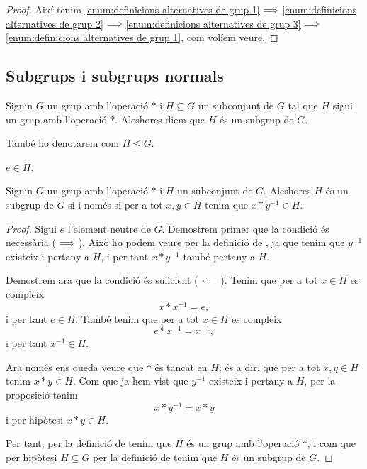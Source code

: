 \documentclass[../Apunts.tex]{subfiles}
\begin{document}
\begin{theorem}
\begin{proof}
			Així tenim \eqref{enum:definicions alternatives de grup 1}\(\implies\)\eqref{enum:definicions alternatives de grup 2}\(\implies\)\eqref{enum:definicions alternatives de grup 3}\(\implies\)\eqref{enum:definicions alternatives de grup 1}, com volíem veure.
		\end{proof}
	\end{theorem}
	\subsection{Subgrups i subgrups normals}
	\begin{definition}[Subgrup]
		\label{def:subgrup}
		Siguin \(G\) un grup amb l'operació \(\ast\) i \(H\subseteq G\) un subconjunt de \(G\) tal que \(H\) sigui un grup amb l'operació \(\ast\). Aleshores diem que \(H\) és un subgrup de \(G\).
		
		També ho denotarem com \(H\leq G\).
	\end{definition}
	\begin{observation}
		\label{obs:l'element neutre d'un grup pertany als subgrups}
		\(e\in H\).
	\end{observation}
	\begin{proposition}
		\label{prop:condició equivalent a subgrup}
		Siguin \(G\) un grup amb l'operació \(\ast\) i \(H\) un subconjunt de \(G\). Aleshores \(H\) és un subgrup de \(G\) si i només si per a tot \(x,y\in H\) tenim que \(x\ast y^{-1}\in H\).
		\begin{proof}
			Sigui \(e\) l'element neutre de \(G\). Demostrem primer que la condició és necessària (\(\implies\)). Això ho podem veure per la definició de , ja que tenim que \(y^{-1}\) existeix i pertany a \(H\), i per tant \(x\ast y^{-1}\) també pertany a \(H\).
			
			Demostrem ara que la condició és suficient (\(\impliedby\)). Tenim que per a tot \(x\in H\) es compleix
			\[x\ast x^{-1}=e,\]
			i per tant \(e\in H\). També tenim que per a tot \(x\in H\) es compleix
			\[e\ast x^{-1}=x^{-1},\]
			i per tant \(x^{-1}\in H\).
			
			Ara només ens queda veure que \(\ast\) és tancat en \(H\); és a dir, que per a tot \(x,y\in H\) tenim \(x\ast y\in H\). Com que ja hem vist que \(y^{-1}\) existeix i pertany a \(H\), per la proposició  tenim
			\[x\ast y^{-1}=x\ast y\]
			i per hipòtesi \(x\ast y\in H\).
			
			Per tant, per la definició de  tenim que \(H\) és un grup amb l'operació \(\ast\), i com que per hipòtesi \(H\subseteq G\) per la definició de  tenim que \(H\) és un subgrup de \(G\).
		\end{proof}
	\end{proposition}
\end{document}
